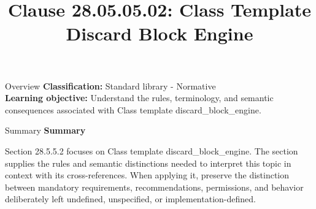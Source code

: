 \documentclass[10pt,letterpaper]{article}
\title{Clause 28.05.05.02: Class Template Discard Block Engine}
\author{}
\date{}
\begin{document}
\maketitle
\begin{CornellOverviewBox}{Overview}
\textbf{Classification:} Standard library - Normative\\[2pt]
\textbf{Learning objective:} Understand the rules, terminology, and semantic consequences associated with Class template discard\_block\_engine.
\end{CornellOverviewBox}\begin{CornellSummaryBox}{Summary}
{\sffamily\bfseries\color{Accent} Summary}\par\vspace{3pt}Section 28.5.5.2 focuses on Class template discard\_block\_engine. The section supplies the rules and semantic distinctions needed to interpret this topic in context with its cross-references. When applying it, preserve the distinction between mandatory requirements, recommendations, permissions, and behavior deliberately left undefined, unspecified, or implementation-defined.
\end{CornellSummaryBox}
\end{document}
